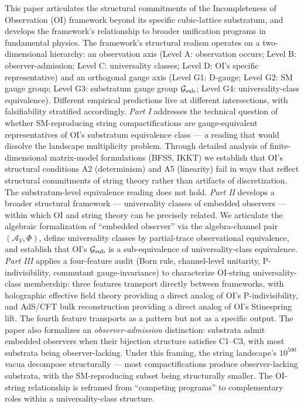 \documentclass[
]{article}
\begin{document}
This paper articulates the structural commitments of the Incompleteness
of Observation (OI) framework beyond its specific cubic-lattice
substratum, and develops the framework's relationship to broader
unification programs in fundamental physics. The framework's structural
realism operates on a two-dimensional hierarchy: an observation axis
(Level A: observation occurs; Level B: observer-admission; Level C:
universality classes; Level D: OI's specific representative) and an
orthogonal gauge axis (Level G1: D-gauge; Level G2: SM gauge group;
Level G3: substratum gauge group \(\mathcal{G}_{\rm sub}\); Level G4:
universality-class equivalence). Different empirical predictions live at
different intersections, with falsifiability stratified accordingly.
\emph{Part I} addresses the technical question of whether SM-reproducing
string compactifications are gauge-equivalent representatives of OI's
substratum equivalence class --- a reading that would dissolve the
landscape multiplicity problem. Through detailed analysis of
finite-dimensional matrix-model formulations (BFSS, IKKT) we establish
that OI's structural conditions A2 (determinism) and A5 (linearity) fail
in ways that reflect structural commitments of string theory rather than
artifacts of discretization. The substratum-level equivalence reading
does not hold. \emph{Part II} develops a broader structural framework
--- universality classes of embedded observers --- within which OI and
string theory can be precisely related. We articulate the algebraic
formalization of ``embedded observer'' via the algebra-channel pair
\((\mathcal{A}_V, \Phi)\), define universality classes by partial-trace
observational equivalence, and establish that OI's
\(\mathcal{G}_{\rm sub}\) is a sub-equivalence of universality-class
equivalence. \emph{Part III} applies a four-feature audit (Born rule,
channel-level unitarity, P-indivisibility, commutant gauge-invariance)
to characterize OI-string universality-class membership: three features
transport directly between frameworks, with holographic effective field
theory providing a direct analog of OI's P-indivisibility, and AdS/CFT
bulk reconstruction providing a direct analog of OI's Stinespring lift.
The fourth feature transports as a pattern but not as a specific output.
The paper also formalizes an \emph{observer-admission} distinction:
substrata admit embedded observers when their bijection structure
satisfies C1--C3, with most substrata being observer-lacking. Under this
framing, the string landscape's \(10^{500}\) vacua decompose
structurally --- most compactifications produce observer-lacking
substrata, with the SM-reproducing subset being structurally smaller.
The OI-string relationship is reframed from ``competing programs'' to
complementary roles within a universality-class structure.
\end{document}
